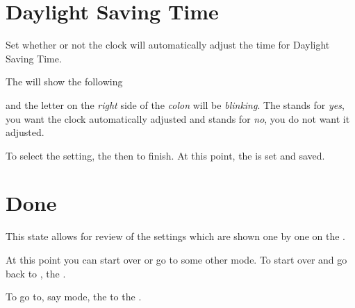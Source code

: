 \section{Daylight Saving Time} 

Set whether or not the clock will automatically adjust the time for Daylight
Saving Time.

\par\medskip

The  will show the following


and the letter on the \textit{right} side of the \textit{colon} will be
\textit{blinking}.  The  stands for \textit{yes}, you want
the clock automatically adjusted and  stands for \textit{no},
you do not want it adjusted.

\par\medskip

To select the  setting,  the  then  to finish.
At this point, the  is set and saved.


\pagebreak
\section{Done} 

This state allows for review of the settings which are shown one by one on the
.

\par\medskip

At this point you can start over or go to some other mode.  To start over and go
back to ,  the .


To go to, say  mode,  the  to the .

